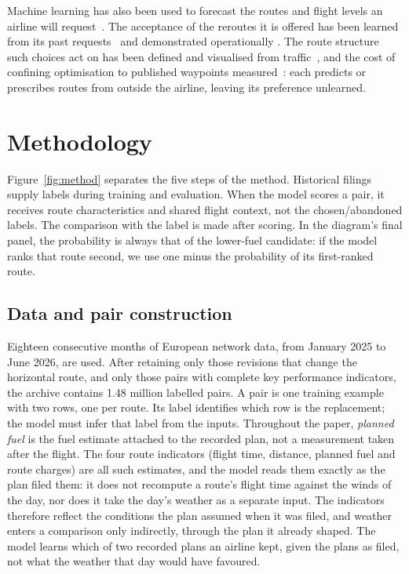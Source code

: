 \documentclass[a4paper,conference]{IEEEtran}
\begin{document}
Machine learning has also been used to forecast the routes and flight
levels an airline will request~\cite{mateos2020routes,mateos2020fl}. The
acceptance of the reroutes it is offered has been learned from its past
requests~\cite{evans2018,evans2019} and demonstrated operationally
\cite{lee2021}. The route structure such choices act on has been defined
and visualised from traffic~\cite{zelinski2011,paradis2022}, and the cost
of confining optimisation to published waypoints measured~\cite{karr2018}:
each predicts or prescribes routes from outside the airline, leaving its
preference unlearned.



\section{Methodology} \label{sec:method}

Figure~\ref{fig:method} separates the five steps of the method. Historical
filings supply labels during training and evaluation. When the model
scores a pair, it receives route characteristics and shared flight
context, not the chosen/abandoned labels. The comparison with the label
is made after scoring. In the diagram's final panel, the probability is
always that of the lower-fuel candidate: if the model ranks that route
second, we use one minus the probability of its first-ranked route.

\subsection{Data and pair construction}

Eighteen consecutive months of European network data, from January 2025 to
June 2026, are used. After retaining only those revisions that change the
horizontal route, and only those pairs with complete key performance
indicators, the archive contains 1.48 million labelled pairs. A pair is one training
example with two rows, one per route. Its label identifies which row is
the replacement; the model must infer that label from the inputs.
Throughout the paper, \emph{planned fuel} is the fuel estimate
attached to the recorded plan, not a measurement taken after the flight. The
four route indicators (flight time, distance, planned fuel and route
charges) are all such estimates, and the model reads them exactly as the
plan filed them: it does not recompute a route's flight time against the
winds of the day, nor does it take the day's weather as a separate input. The
indicators therefore reflect the conditions the plan assumed when it was
filed, and weather enters a comparison only indirectly, through the plan it
already shaped. The model learns which of two recorded plans an airline kept,
given the plans as filed, not what the weather that day would have favoured.
\end{document}
